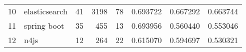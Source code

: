 \begin{tabular}{llrrrrrr}
10 &      elasticsearch &                         41 &                       3198 &                                 78 &                    0.693722 &                 0.667292 &             0.663744 \\
11 &        spring-boot &                         35 &                        455 &                                 13 &                    0.693956 &                 0.560440 &             0.553046 \\
12 &               n4js &                         12 &                        264 &                                 22 &                    0.615070 &                 0.594697 &             0.530321 \\
\bottomrule
\end{tabular}
